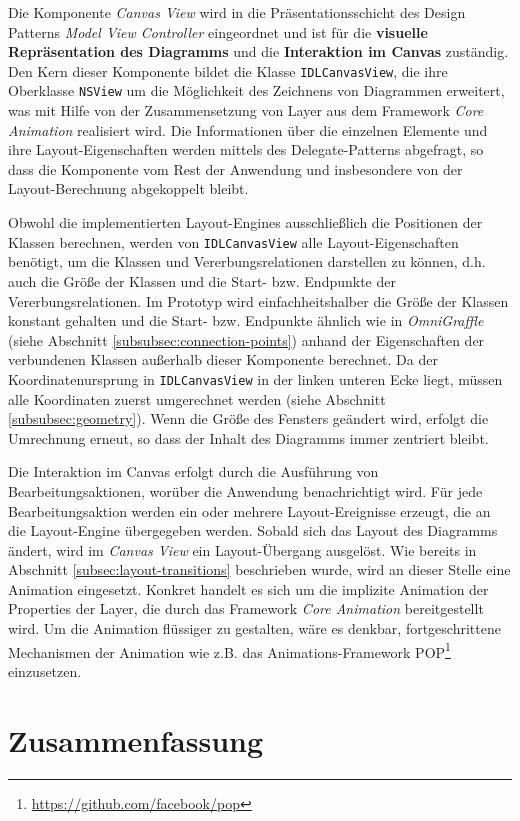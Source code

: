 Die Komponente \textit{Canvas View} wird in die Präsentationsschicht des Design Patterns \textit{Model View Controller} eingeordnet und ist für die \textbf{visuelle Repräsentation des Diagramms} und die \textbf{Interaktion im Canvas} zuständig. Den Kern dieser Komponente bildet die Klasse \texttt{IDLCanvas\-View}, die ihre Oberklasse \texttt{NSView} um die Möglichkeit des Zeichnens von Diagrammen erweitert, was mit Hilfe von der Zusammensetzung von Layer aus dem Framework \textit{Core Animation} realisiert wird. Die Informationen über die einzelnen Elemente und ihre Layout-Eigenschaften werden mittels des Delegate-Patterns abgefragt, so dass die Komponente vom Rest der Anwendung und insbesondere von der Layout-Berechnung abgekoppelt bleibt.

Obwohl die implementierten Layout-Engines ausschließlich die Positionen der Klassen berechnen, werden von \texttt{IDLCanvasView} alle Layout-Eigenschaften benötigt, um die Klassen und Vererbungsrelationen darstellen zu können, d.h. auch die Größe der Klassen und die Start- bzw. Endpunkte der Vererbungsrelationen. Im Prototyp wird einfachheitshalber die Größe der Klassen konstant gehalten und die Start- bzw. Endpunkte ähnlich wie in \textit{OmniGraffle} (siehe Abschnitt \ref{subsubsec:connection-points}) anhand der Eigenschaften der verbundenen Klassen außerhalb dieser Komponente berechnet. Da der Koordinatenursprung in \texttt{IDLCanvasView} in der linken unteren Ecke liegt, müssen alle Koordinaten zuerst umgerechnet werden (siehe Abschnitt \ref{subsubsec:geometry}). Wenn die Größe des Fensters geändert wird, erfolgt die Umrechnung erneut, so dass der Inhalt des Diagramms immer zentriert bleibt.

Die Interaktion im Canvas erfolgt durch die Ausführung von Bearbeitungsaktionen, worüber die Anwendung benachrichtigt wird. Für jede Bearbeitungsaktion werden ein oder mehrere Layout-Ereignisse erzeugt, die an die Layout-Engine übergegeben werden. Sobald sich das Layout des Diagramms ändert, wird im \textit{Canvas View} ein Layout-Übergang ausgelöst. Wie bereits in Abschnitt \ref{subsec:layout-transitions} beschrieben wurde, wird an dieser Stelle eine Animation eingesetzt. Konkret handelt es sich um die implizite Animation der Properties der Layer, die durch das Framework \textit{Core Animation} bereitgestellt wird. Um die Animation flüssiger zu gestalten, wäre es denkbar, fortgeschrittene Mechanismen der Animation wie z.B. das Animations-Framework POP\footnote{\url{https://github.com/facebook/pop}} einzusetzen.

\section{Zusammenfassung}

